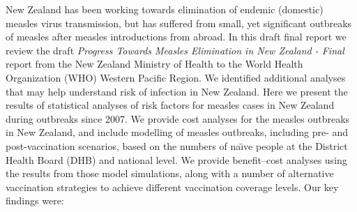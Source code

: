 \documentclass{article}
\begin{document}
\begin{itemize}
New Zealand has been working towards elimination of endemic (domestic) measles virus transmission, but has suffered from small, yet significant outbreaks of measles after measles introductions from abroad. In this draft final report we review the draft \emph {Progress Towards Measles Elimination in New Zealand - Final} report from the New Zealand Ministry of Health to the World Health Organization (WHO) Western Pacific Region. We identified additional analyses that may help understand risk of infection in New Zealand. Here we present the results of statistical analyses of risk factors for measles cases in New Zealand during outbreaks since 2007. We provide cost analyses for the measles outbreaks in New Zealand, and include modelling of measles outbreaks, including pre- and post-vaccination scenarios, based on the numbers of na\"{\i}ve people at the District Health Board (DHB) and national level. We provide benefit--cost analyses using the results from those model simulations, along with a number of alternative vaccination strategies to achieve different vaccination coverage levels. Our key findings were:


\end{itemize}
\end{document}

